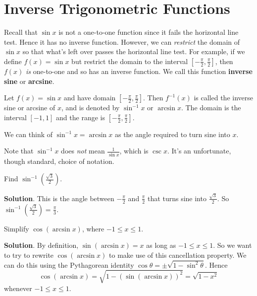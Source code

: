 \documentclass[10pt,]{book}
\newcommand{\terminology}[1]{\textbf{#1}}
\theoremstyle{ptxplainnotitle}
\theoremstyle{ptxplaintitle}
\theoremstyle{ptxplainnotitle}
\theoremstyle{ptxplaintitle}
\theoremstyle{ptxplainnotitle}
\theoremstyle{ptxplaintitle}
\theoremstyle{ptxdefinitionnotitle}
\theoremstyle{ptxdefinitiontitle}
\theoremstyle{ptxdefinitionnotitle}
\theoremstyle{ptxdefinitiontitle}
\theoremstyle{ptxdefinitionnotitle}
\theoremstyle{ptxdefinitiontitle}
\theoremstyle{ptxdefinitionnotitle}
\theoremstyle{ptxdefinitiontitle}
\theoremstyle{ptxdefinitionnotitle}
\theoremstyle{ptxdefinitiontitle}
\numberwithin{equation}{section}
\begin{document}
\section[{Inverse Trigonometric Functions}]{Inverse Trigonometric Functions}\label{section-inverse-trigonometric-functions}
\hypertarget{p-257}{}%
Recall that \(\sin x\) is not a one-to-one function since it fails the horizontal line test. Hence it has no inverse function. However, we can \emph{restrict} the domain of \(\sin x\) so that what's left over passes the horizontal line test. For example, if we define \(f(x) = \sin x\) but restrict the domain to the interval \([-\frac{\pi}{2},\frac{\pi}{2}]\), then \(f(x)\) \emph{is} one-to-one and so has an inverse function. We call this function \terminology{inverse sine} or \terminology{arcsine}.%
\begin{definition}\label{definition-inverse-sine}
\hypertarget{p-258}{}%
Let \(f(x) = \sin x\) and have domain \([-\frac{\pi}{2},\frac{\pi}{2}]\). Then \(f^{-1}(x)\) is called the inverse sine or arcsine of \(x\), and is denoted by \(\sin^{-1}x\) or \(\arcsin x\). The domain is the interval \([-1,1]\) and the range is \([-\frac{\pi}{2},\frac{\pi}{2}]\).%
\end{definition}
\hypertarget{p-259}{}%
We can think of \(\sin^{-1}x = \arcsin x\) as the angle required to turn sine into \(x\). \begin{aside}{}\label{aside-8}
\hypertarget{p-260}{}%
Note that \(\sin^{-1}x\) does \emph{not} mean \(\frac{1}{\sin x}\), which is \(\csc x\). It's an unfortunate, though standard, choice of notation.%
\end{aside}
%
\begin{example}\label{example-finding-inverse-sine}
\hypertarget{p-261}{}%
Find \(\sin^{-1}(\frac{\sqrt{3}}{2})\).%
\par\smallskip%
\noindent\textbf{Solution}.\hypertarget{solution-56}{}\quad%
\hypertarget{p-262}{}%
This is the angle between \(-\frac{\pi}{2}\) and \(\frac{\pi}{2}\) that turns sine into \(\frac{\sqrt{3}}{2}\). So \(\sin^{-1}(\frac{\sqrt{3}}{2}) = \frac{\pi}{3}\).%
\end{example}
\begin{example}\label{example-simplifying-cosine-and-inverse-sine}
\hypertarget{p-263}{}%
Simplify \(\cos(\arcsin x)\), where \(-1\leq x\leq 1\).%
\par\smallskip%
\noindent\textbf{Solution}.\hypertarget{solution-57}{}\quad%
\hypertarget{p-264}{}%
By definition, \(\sin(\arcsin x) = x\) as long as \(-1\leq x\leq 1\). So we want to try to rewrite \(\cos(\arcsin x)\) to make use of this cancellation property. We can do this using the Pythagorean identity \(\cos \theta = \pm\sqrt{1-\sin^{2}\theta}\). Hence%
\begin{equation*}
\cos(\arcsin x) = \sqrt{1-(\sin(\arcsin x))^{2}} = \sqrt{1 - x^{2}}
\end{equation*}
whenever \(-1\leq x\leq 1\).%
\end{example}
\end{document}
